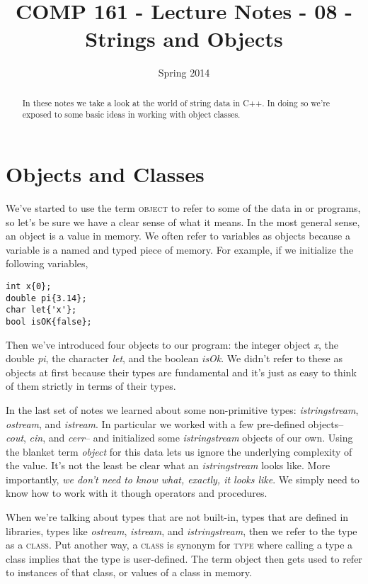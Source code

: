 \documentclass[]{tufte-handout}
\title{COMP 161 - Lecture Notes - 08 - Strings and Objects}
\date{Spring 2014}
\begin{document}
 
\maketitle

\begin{abstract}
In these notes we take a look at the world of string data in C++.  In doing so we're exposed to some basic ideas in working with object classes.
\end{abstract}

\section{Objects and Classes}

We've started to use the term \textsc{object} to refer to some of the data in or programs, so let's be sure we have a clear sense of what it means.  In the most general sense, an object is a value in memory. We often refer to variables as objects because a variable is a named and typed piece of memory. For example, if we initialize the following variables,
\begin{verbatim}
int x{0};
double pi{3.14};
char let{'x'};
bool isOK{false};
\end{verbatim} 
Then we've introduced four objects to our program: the integer object \textit{x}, the double \textit{pi}, the character \textit{let}, and the boolean \textit{isOk}.  We didn't refer to these as objects at first because their types are fundamental and it's just as easy to think of them strictly in terms of their types.  

In the last set of notes we learned about some non-primitive types: \textit{istringstream}, \textit{ostream}, and \textit{istream}.  In particular we worked with a few pre-defined objects-- \textit{cout}, \textit{cin}, and \textit{cerr}-- and initialized some \textit{istringstream} objects of our own. Using the blanket term \textit{object} for this data lets us ignore the underlying complexity of the value. It's not the least be clear what an \textit{istringstream} looks like. More importantly, \textit{we don't need to know what, exactly, it looks like}. We simply need to know how to work with it though operators and procedures. 

When we're talking about types that are not built-in, types that are defined in libraries, types like \textit{ostream}, \textit{istream}, and \textit{istringstream}, then we refer to the type as a \textsc{class}.  Put another way, a \textsc{class} is synonym for \textsc{type} where calling a type a class implies that the type is user-defined.  The term object then gets used to refer to instances of that class, or values of a class in memory. 
\end{document}
